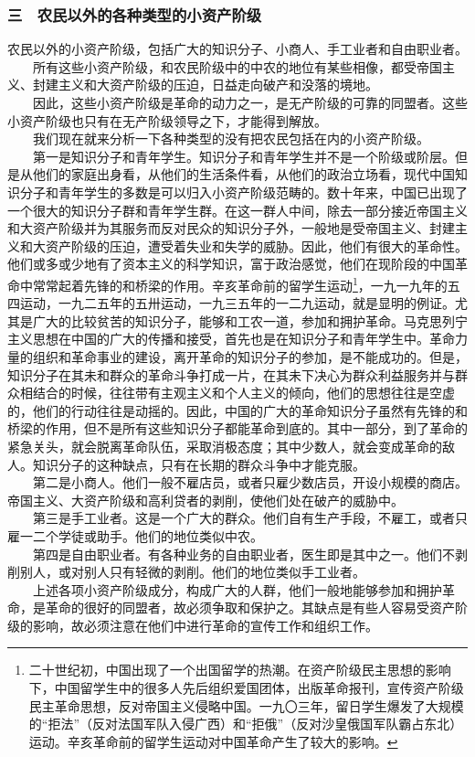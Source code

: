 \documentclass[cn,11pt,chinese]{elegantbook}
\def\myformat#1{\hfil\hfil #1}
\begin{document}
\subsubsection*{\myformat{三　农民以外的各种类型的小资产阶级}}
农民以外的小资产阶级，包括广大的知识分子、小商人、手工业者和自由职业者。\\
　　所有这些小资产阶级，和农民阶级中的中农的地位有某些相像，都受帝国主义、封建主义和大资产阶级的压迫，日益走向破产和没落的境地。\\
　　因此，这些小资产阶级是革命的动力之一，是无产阶级的可靠的同盟者。这些小资产阶级也只有在无产阶级领导之下，才能得到解放。\\
　　我们现在就来分析一下各种类型的没有把农民包括在内的小资产阶级。\\
　　第一是知识分子和青年学生。知识分子和青年学生并不是一个阶级或阶层。但是从他们的家庭出身看，从他们的生活条件看，从他们的政治立场看，现代中国知识分子和青年学生的多数是可以归入小资产阶级范畴的。数十年来，中国已出现了一个很大的知识分子群和青年学生群。在这一群人中间，除去一部分接近帝国主义和大资产阶级并为其服务而反对民众的知识分子外，一般地是受帝国主义、封建主义和大资产阶级的压迫，遭受着失业和失学的威胁。因此，他们有很大的革命性。他们或多或少地有了资本主义的科学知识，富于政治感觉，他们在现阶段的中国革命中常常起着先锋的和桥梁的作用。辛亥革命前的留学生运动\footnote[35]{ 二十世纪初，中国出现了一个出国留学的热潮。在资产阶级民主思想的影响下，中国留学生中的很多人先后组织爱国团体，出版革命报刊，宣传资产阶级民主革命思想，反对帝国主义侵略中国。一九〇三年，留日学生爆发了大规模的“拒法”（反对法国军队入侵广西）和“拒俄”（反对沙皇俄国军队霸占东北）运动。辛亥革命前的留学生运动对中国革命产生了较大的影响。}，一九一九年的五四运动，一九二五年的五卅运动，一九三五年的一二九运动，就是显明的例证。尤其是广大的比较贫苦的知识分子，能够和工农一道，参加和拥护革命。马克思列宁主义思想在中国的广大的传播和接受，首先也是在知识分子和青年学生中。革命力量的组织和革命事业的建设，离开革命的知识分子的参加，是不能成功的。但是，知识分子在其未和群众的革命斗争打成一片，在其未下决心为群众利益服务并与群众相结合的时候，往往带有主观主义和个人主义的倾向，他们的思想往往是空虚的，他们的行动往往是动摇的。因此，中国的广大的革命知识分子虽然有先锋的和桥梁的作用，但不是所有这些知识分子都能革命到底的。其中一部分，到了革命的紧急关头，就会脱离革命队伍，采取消极态度；其中少数人，就会变成革命的敌人。知识分子的这种缺点，只有在长期的群众斗争中才能克服。\\
　　第二是小商人。他们一般不雇店员，或者只雇少数店员，开设小规模的商店。帝国主义、大资产阶级和高利贷者的剥削，使他们处在破产的威胁中。\\
　　第三是手工业者。这是一个广大的群众。他们自有生产手段，不雇工，或者只雇一二个学徒或助手。他们的地位类似中农。\\
　　第四是自由职业者。有各种业务的自由职业者，医生即是其中之一。他们不剥削别人，或对别人只有轻微的剥削。他们的地位类似手工业者。\\
　　上述各项小资产阶级成分，构成广大的人群，他们一般地能够参加和拥护革命，是革命的很好的同盟者，故必须争取和保护之。其缺点是有些人容易受资产阶级的影响，故必须注意在他们中进行革命的宣传工作和组织工作。\\
\end{document}
